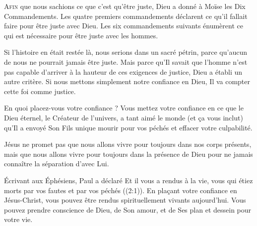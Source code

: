 
\lettrine{A}{fin} que nous sachions ce que c'est qu'être juste,
 Dieu a donné à Moïse les Dix Commandements.
 Les quatre premiers commandements déclarent ce qu'il fallait faire
 pour être juste avec Dieu.
 Les six commandements suivants énumèrent ce qui est nécessaire
 pour être juste avec les hommes. 

Si l'histoire en était restée là, nous serions dans un sacré pétrin,
 parce qu'aucun de nous ne pourrait jamais être juste.
 Mais parce qu'Il savait que l'homme n'est pas capable d'arriver
 à la hauteur de ces exigences de justice, Dieu a établi un autre critère.
 Si nous mettons simplement notre confiance en Dieu,
 Il va compter cette foi comme justice. 

En quoi placez-vous votre confiance ?
 Vous mettez votre confiance en ce que le Dieu éternel,
 le Créateur de l'univers, a tant aimé le monde (et \c{c}a vous inclut)
 qu'Il a envoyé Son Fils unique mourir pour vos péchés
 et effacer votre culpabilité. 


Jésus ne promet pas que nous allons vivre pour toujours
 dans nos corps présents, mais que nous allons vivre pour toujours
 dans la présence de Dieu
 \ocadr pour ne jamais connaître la séparation d'avec Lui. 

Écrivant aux Éphésiens, Paul a déclaré\frcolon{}
 \Og Et il vous a rendus à la vie, vous qui étiez morts par vos fautes
 et par vos péchés \Fg{} ((2:1)).
 En pla\c{c}ant votre confiance en Jésus-Christ, vous pouvez être rendus
 spirituellement vivants aujourd'hui.
 Vous pouvez prendre conscience de Dieu, de Son amour, et de Ses plan
 et dessein pour votre vie. 

\dvrule






